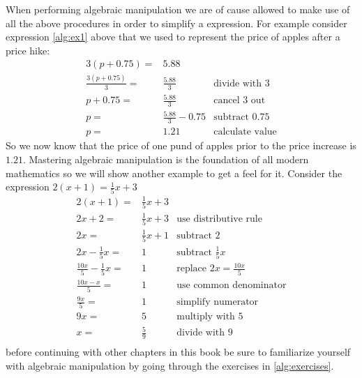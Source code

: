 When performing algebraic manipulation we are of cause allowed to make use of all the above procedures in order to simplify a expression. For example consider expression \ref{alg:ex1} above that we used to represent the price of apples after a price hike:
\begin{align*}
3(p + 0.75)           =& 5.88                  &                          \\
\frac{3(p + 0.75)}{3} =& \frac{5.88}{3}        & \textrm{divide with $3$} \\
p + 0.75              =& \frac{5.88}{3}        & \textrm{cancel $3$ out}  \\
p                     =& \frac{5.88}{3} - 0.75 & \textrm{subtract $0.75$} \\
p                     =& 1.21                  & \textrm{calculate value}
\end{align*}
So we now know that the price of one pund of apples prior to the price increase is $1.21$. Mastering algebraic manipulation is the foundation of all modern mathematics so we will show another example to get a feel for it. Consider the expression $2(x + 1) = \frac{1}{5}x + 3$
\begin{align*}
2(x + 1)                     =& \frac{1}{5}x + 3 &                                       \\
2x + 2                       =& \frac{1}{5}x + 3 & \textrm{use distributive rule}        \\
2x                           =& \frac{1}{5}x + 1 & \textrm{subtract $2$}                 \\
2x - \frac{1}{5}x            =& 1                & \textrm{subtract $\frac{1}{5}x$}      \\
\frac{10x}{5} - \frac{1}{5}x =& 1                & \textrm{replace $2x = \frac{10x}{5}$} \\
\frac{10x - x}{5}            =& 1                & \textrm{use common denominator}       \\
\frac{9x}{5}                 =& 1                & \textrm{simplify numerator}           \\
9x                           =& 5                & \textrm{multiply with $5$}            \\
x                            =& \frac{5}{9}      & \textrm{divide with $9$}              \\
\end{align*}
before continuing with other chapters in this book be sure to familiarize yourself with algebraic manipulation by going through the exercises in
\ref{alg:exercises}.

